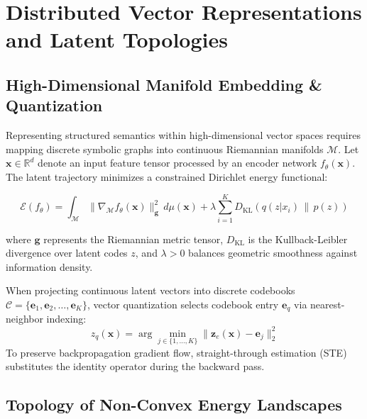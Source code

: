 \documentclass[
  11pt,
  a4paper,
  twoside=true,
  headsepline=0.8pt,
  footsepline=false,
  open=right,
  numbers=noenddot,
  chapterprefix=false,
  BCOR=6mm
]{scrbook}
\begin{document}
\mainmatter

\chapter{Distributed Vector Representations and Latent Topologies}

\section{High-Dimensional Manifold Embedding \& Quantization}

Representing structured semantics within high-dimensional vector spaces requires mapping discrete symbolic graphs into continuous Riemannian manifolds $\mathcal{M}$. Let $\mathbf{x} \in \mathbb{R}^d$ denote an input feature tensor processed by an encoder network $f_\theta(\mathbf{x})$. The latent trajectory minimizes a constrained Dirichlet energy functional:

\begin{equation}
  \mathcal{E}(f_\theta) = \int_{\mathcal{M}} \|\nabla_{\mathcal{M}} f_\theta(\mathbf{x})\|^2_{\mathbf{g}} \, d\mu(\mathbf{x}) + \lambda \sum_{i=1}^{K} D_{\text{KL}}\!\left(q(z|x_i) \,\|\, p(z)\right)
\end{equation}

where $\mathbf{g}$ represents the Riemannian metric tensor, $D_{\text{KL}}$ is the Kullback-Leibler divergence over latent codes $z$, and $\lambda > 0$ balances geometric smoothness against information density.

\begin{conceptbox}
When projecting continuous latent vectors into discrete codebooks $\mathcal{C} = \{\mathbf{e}_1, \mathbf{e}_2, \dots, \mathbf{e}_K\}$, vector quantization selects codebook entry $\mathbf{e}_q$ via nearest-neighbor indexing:
\begin{equation*}
  z_q(\mathbf{x}) = \arg\min_{j \in \{1,\dots,K\}} \|\mathbf{z}_e(\mathbf{x}) - \mathbf{e}_j\|_2^2
\end{equation*}
To preserve backpropagation gradient flow, straight-through estimation (STE) substitutes the identity operator during the backward pass.
\end{conceptbox}

\section{Topology of Non-Convex Energy Landscapes}
\end{document}
